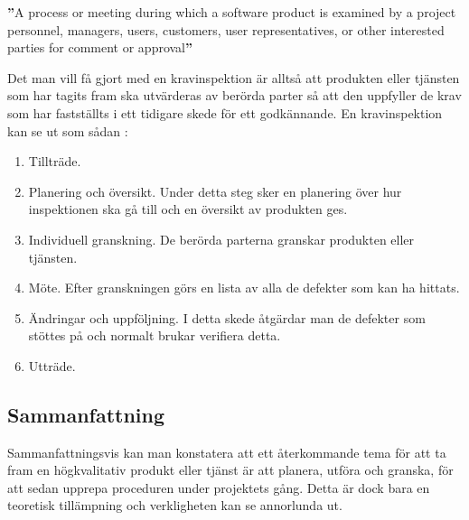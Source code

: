 \begin{tcolorbox}[boxrule=1pt,leftrule=5pt,arc=0pt,auto outer arc]
\textbf{''}A process or meeting during which a software product is examined by a project personnel, managers, users, customers, user representatives, or other interested parties for comment or approval\textbf{''} \cite{SFSR}
\end{tcolorbox}

\noindent
Det man vill få gjort med en kravinspektion är alltså att produkten eller tjänsten som har tagits fram ska utvärderas av berörda parter så att den uppfyller de krav som har fastställts i ett tidigare skede för ett godkännande. En kravinspektion kan se ut som sådan \citep{Sandahl}:
\begin{enumerate}
\item{Tillträde.}
\item{Planering och översikt. Under detta steg sker en planering över hur inspektionen ska gå till och en översikt av produkten ges.}
\item{Individuell granskning. De berörda parterna granskar produkten eller tjänsten.}
\item{Möte. Efter granskningen görs en lista av alla de defekter som kan ha hittats.}
\item{Ändringar och uppföljning. I detta skede åtgärdar man de defekter som stöttes på och normalt brukar verifiera detta.}
\item{Utträde.}
\end{enumerate}

\subsection{Sammanfattning}
Sammanfattningsvis kan man konstatera att ett återkommande tema för att ta fram en högkvalitativ produkt eller tjänst är att planera, utföra och granska, för att sedan upprepa proceduren under projektets gång. Detta är dock bara en teoretisk tillämpning och verkligheten kan se annorlunda ut.
